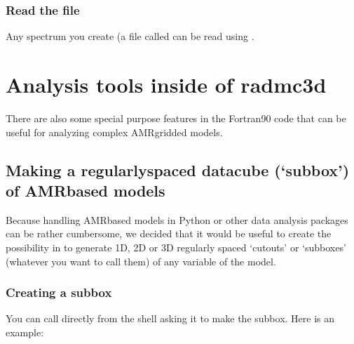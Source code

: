 \documentclass[letterpaper,10pt,english]{sphinxmanual}
\begin{document}
\subsection{Read the  file}
\label{\detokenize{pythontools:read-the-spectrum-out-file}}
Any spectrum you create (a file called  can be
read using .


\chapter{Analysis tools inside of radmc3d}
\label{\detokenize{toolsinside:analysis-tools-inside-of-radmc3d}}\label{\detokenize{toolsinside:chap-radmc3d-internal-analysis-tools}}\label{\detokenize{toolsinside::doc}}
There are also some special purpose features in the Fortran\sphinxhyphen{}90  code that can be useful for analyzing complex AMR\sphinxhyphen{}gridded models.


\section{Making a regularly\sphinxhyphen{}spaced datacube (‘subbox’) of AMR\sphinxhyphen{}based models}
\label{\detokenize{toolsinside:making-a-regularly-spaced-datacube-subbox-of-amr-based-models}}\label{\detokenize{toolsinside:sec-subbox}}
Because handling AMR\sphinxhyphen{}based models in Python or other data analysis packages can
be rather cumbersome, we decided that it would be useful to create the
possibility in  to generate 1\sphinxhyphen{}D, 2\sphinxhyphen{}D or 3\sphinxhyphen{}D regularly spaced
‘cut\sphinxhyphen{}outs’ or ‘sub\sphinxhyphen{}boxes’ (whatever you want to call them) of any variable of
the model.


\subsection{Creating a subbox}
\label{\detokenize{toolsinside:creating-a-subbox}}
You can call  directly from the shell asking it to make
the subbox. Here is an example:

\begin{sphinxVerbatim}[commandchars=\\\{\}]
            
\end{sphinxVerbatim}
\end{document}
